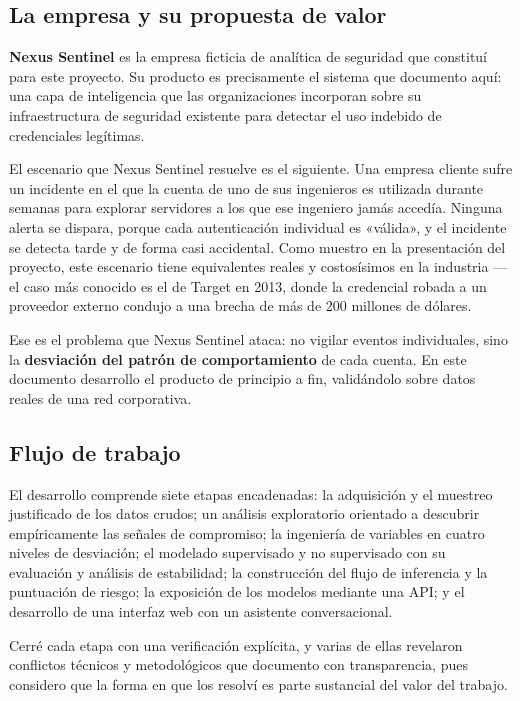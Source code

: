 \documentclass[12pt, a4paper]{article}
\begin{document}
\subsection{La empresa y su propuesta de valor}

\textbf{Nexus Sentinel} es la empresa ficticia de analítica de seguridad que constituí para este
proyecto. Su producto es precisamente el sistema que documento aquí: una capa de inteligencia que
las organizaciones incorporan sobre su infraestructura de seguridad existente para detectar el uso
indebido de credenciales legítimas.

El escenario que Nexus Sentinel resuelve es el siguiente. Una empresa cliente sufre un incidente en
el que la cuenta de uno de sus ingenieros es utilizada durante semanas para explorar servidores a
los que ese ingeniero jamás accedía. Ninguna alerta se dispara, porque cada autenticación individual
es «válida», y el incidente se detecta tarde y de forma casi accidental. Como muestro en la
presentación del proyecto, este escenario tiene equivalentes reales y costosísimos en la industria
---el caso más conocido es el de Target en 2013, donde la credencial robada a un proveedor externo
condujo a una brecha de más de 200 millones de dólares.

Ese es el problema que Nexus Sentinel ataca: no vigilar eventos individuales, sino la
\textbf{desviación del patrón de comportamiento} de cada cuenta. En este documento desarrollo el
producto de principio a fin, validándolo sobre datos reales de una red corporativa.

\subsection{Flujo de trabajo}

El desarrollo comprende siete etapas encadenadas: la adquisición y el muestreo justificado de los
datos crudos; un análisis exploratorio orientado a descubrir empíricamente las señales de compromiso;
la ingeniería de variables en cuatro niveles de desviación; el modelado supervisado y no supervisado
con su evaluación y análisis de estabilidad; la construcción del flujo de inferencia y la puntuación
de riesgo; la exposición de los modelos mediante una API; y el desarrollo de una interfaz web con un
asistente conversacional.

Cerré cada etapa con una verificación explícita, y varias de ellas revelaron conflictos técnicos y
metodológicos que documento con transparencia, pues considero que la forma en que los resolví es
parte sustancial del valor del trabajo.
\end{document}
